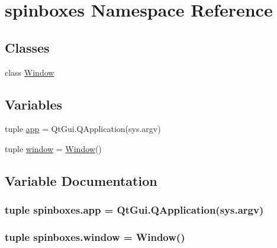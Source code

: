 \hypertarget{namespacespinboxes}{}\section{spinboxes Namespace Reference}
\label{namespacespinboxes}
\subsection*{Classes}
\begin{DoxyCompactItemize}
\item 
class \hyperlink{classspinboxes_1_1Window}{Window}
\end{DoxyCompactItemize}
\subsection*{Variables}
\begin{DoxyCompactItemize}
\item 
tuple \hyperlink{namespacespinboxes_a569bbe2eec17f2780596d52ede59208c}{app} = Qt\+Gui.\+Q\+Application(sys.\+argv)
\item 
tuple \hyperlink{namespacespinboxes_a645d8da289647676f13d98da50c6d77e}{window} = \hyperlink{classspinboxes_1_1Window}{Window}()
\end{DoxyCompactItemize}


\subsection{Variable Documentation}
\hypertarget{namespacespinboxes_a569bbe2eec17f2780596d52ede59208c}{}
\subsubsection[{app}]{\setlength{\rightskip}{0pt plus 5cm}tuple spinboxes.\+app = Qt\+Gui.\+Q\+Application(sys.\+argv)}\label{namespacespinboxes_a569bbe2eec17f2780596d52ede59208c}
\hypertarget{namespacespinboxes_a645d8da289647676f13d98da50c6d77e}{}
\subsubsection[{window}]{\setlength{\rightskip}{0pt plus 5cm}tuple spinboxes.\+window = {\bf Window}()}\label{namespacespinboxes_a645d8da289647676f13d98da50c6d77e}
